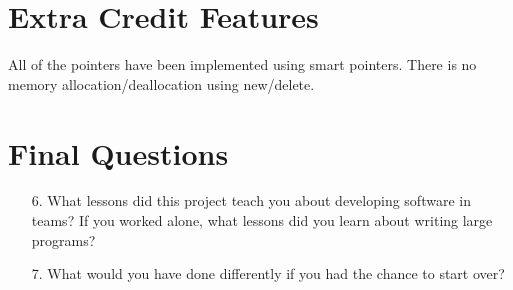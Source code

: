 \documentclass[12pt]{article}
\begin{document}
\section*{Extra Credit Features}

All of the pointers have been implemented using smart pointers. There is no memory allocation/deallocation using new/delete.

\section*{Final Questions}

\begin{enumerate}
\item[6.] What lessons did this project teach you about developing software in teams? If you worked alone, what lessons did you learn about writing large programs?
\item[7.] What would you have done differently if you had the chance to start over?
\end{enumerate}
\end{document}
